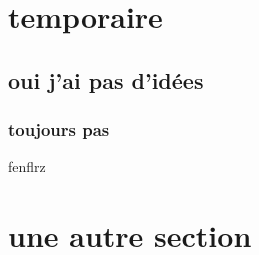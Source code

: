 \documentclass[colorised, sobre]{pfe} %
\begin{document}
\maketitlepage
\settables
\section{temporaire}
\subsection{oui j'ai pas d'idées}
\subsubsection{toujours pas}
fenflrz
\newpage
\section{une autre section}
\end{document}
